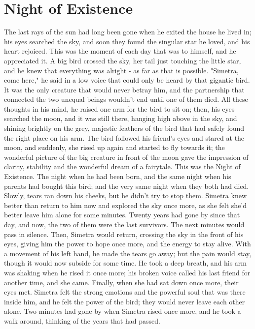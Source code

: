 \chapter{Night of Existence}
\label{cha:night-existence}
The last rays of the sun had long been gone when he exited the house he lived in; his eyes searched the sky, and soon they found the singular star he loved, and his heart rejoiced. This was the moment of each day that was to himself, and he appreciated it. 
A big bird crossed the sky, her tail just touching the little star, and he knew that everything was alright - as far as that is possible. 
"Simetra, come here," he said in a low voice that could only be heard by that gigantic bird. It was the only creature that would never betray him, and the partnership that connected the two unequal beings wouldn't end until one of them died. All these thoughts in his mind, he raised one arm for the bird to sit on; then, his eyes searched the moon, and it was still there, hanging high above in the sky, and shining brightly on the grey, majestic feathers of the bird that had safely found the right place on his arm. 
The bird followed his friend's eyes and stared at the moon, and suddenly, she rised up again and started to fly towards it; the wonderful picture of the big creature in front of the moon gave the impression of clarity, stability and the wonderful dream of a fairytale. 
This was the Night of Existence. 
The night when he had been born, and the same night when his parents had bought this bird; and the very same night when they both had died. 
Slowly, tears ran down his cheeks, but he didn't try to stop them. Simetra knew better than return to him now and explored the sky once more, as she felt she'd better leave him alone for some minutes. Twenty years had gone by since that day, and now, the two of them were the last survivors. 
The next minutes would pass in silence. Then, Simetra would return, crossing the sky in the front of his eyes, giving him the power to hope once more, and the energy to stay alive. 
With a movement of his left hand, he made the tears go away; but the pain would stay, though it would now subside for some time. 
He took a deep breath, and his arm was shaking when he rised it once more; his broken voice called his last friend for another time, and she came. Finally, when she had sat down once more, their eyes met. Simetra felt the strong emotions and the powerful soul that was there inside him, and he felt the power of the bird; they would never leave each other alone. 
Two minutes had gone by when Simetra rised once more, and he took a walk around, thinking of the years that had passed. 
